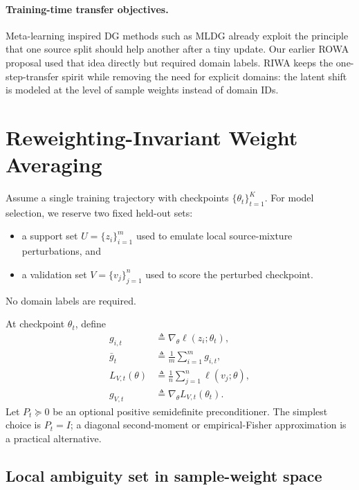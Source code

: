 \documentclass{article}
\newcommand{\riwa}{\textup{\textsc{RIWA}}}
\newcommand{\rowa}{\textup{\textsc{ROWA}}}
\begin{document}
\paragraph{Training-time transfer objectives.}
Meta-learning inspired DG methods such as MLDG \citep{li2018mldg} already exploit the principle that one source split should help another after a tiny update. Our earlier \rowa{} proposal used that idea directly but required domain labels. \riwa{} keeps the one-step-transfer spirit while removing the need for explicit domains: the latent shift is modeled at the level of sample weights instead of domain IDs.

\section{Reweighting-Invariant Weight Averaging}
\label{sec:method}

Assume a single training trajectory with checkpoints $\{\theta_t\}_{t=1}^{K}$. For model selection, we reserve two fixed held-out sets:
\begin{itemize}[leftmargin=1.4em]
    \item a support set $U = \{z_i\}_{i=1}^{m}$ used to emulate local source-mixture perturbations, and
    \item a validation set $V = \{v_j\}_{j=1}^{n}$ used to score the perturbed checkpoint.
\end{itemize}
No domain labels are required.

At checkpoint $\theta_t$, define
\begin{align}
    g_{i,t} &\triangleq \nabla_\theta \ell(z_i;\theta_t),\\
    \bar g_t &\triangleq \frac{1}{m}\sum_{i=1}^{m} g_{i,t},\\
    L_{V,t}(\theta) &\triangleq \frac{1}{n}\sum_{j=1}^{n} \ell(v_j;\theta),\\
    g_{V,t} &\triangleq \nabla_\theta L_{V,t}(\theta_t).
\end{align}
Let $P_t \succeq 0$ be an optional positive semidefinite preconditioner. The simplest choice is $P_t = I$; a diagonal second-moment or empirical-Fisher approximation is a practical alternative.

\subsection{Local ambiguity set in sample-weight space}
\end{document}
